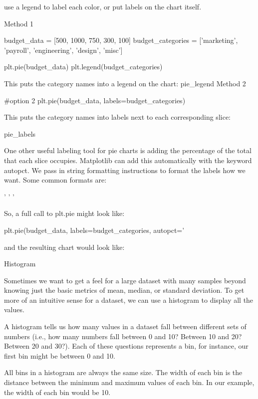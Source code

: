 \documentclass{journal}
\begin{document}
    use a legend to label each color, or
    put labels on the chart itself.

Method 1

budget_data = [500, 1000, 750, 300, 100]
budget_categories = ['marketing', 'payroll', 'engineering', 'design', 'misc']

plt.pie(budget_data)
plt.legend(budget_categories)

This puts the category names into a legend on the chart: pie_legend
Method 2

#option 2
plt.pie(budget_data, labels=budget_categories)

This puts the category names into labels next to each corresponding slice:

pie_labels

One other useful labeling tool for pie charts is adding the percentage of the total that each slice occupies. Matplotlib can add this automatically with the keyword autopct. We pass in string formatting instructions to format the labels how we want. Some common formats are:

    '%
    '%
    '%

So, a full call to plt.pie might look like:

plt.pie(budget_data,
        labels=budget_categories,
        autopct='%

and the resulting chart would look like: 




Histogram

Sometimes we want to get a feel for a large dataset with many samples beyond knowing just the basic metrics of mean, median, or standard deviation. To get more of an intuitive sense for a dataset, we can use a histogram to display all the values.

A histogram tells us how many values in a dataset fall between different sets of numbers (i.e., how many numbers fall between 0 and 10? Between 10 and 20? Between 20 and 30?). Each of these questions represents a bin, for instance, our first bin might be between 0 and 10.

All bins in a histogram are always the same size. The width of each bin is the distance between the minimum and maximum values of each bin. In our example, the width of each bin would be 10.
\end{document}
